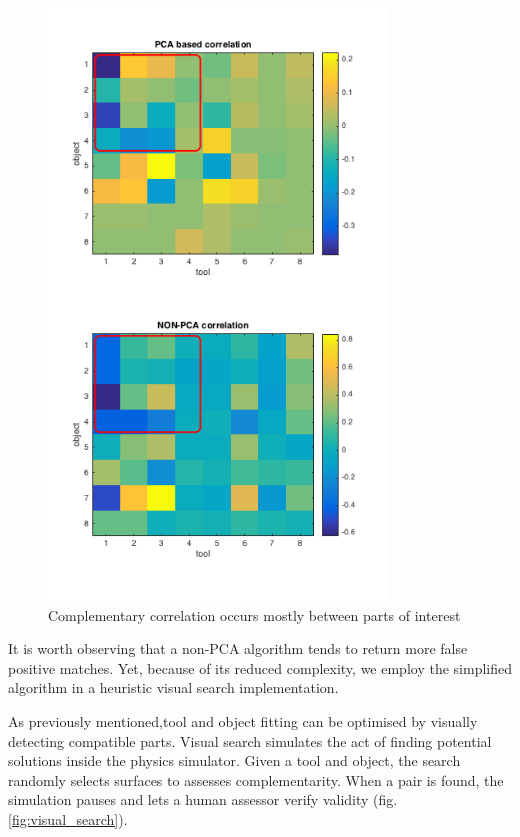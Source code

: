 \documentclass[11]{article}
\begin{document}
\begin{figure}[!h]
  \centering
  \includegraphics[width=0.8\textwidth]{figures/correlation_comparison.png}
  \caption{Complementary correlation occurs mostly between parts of interest}
  \label{fig:correlation_parts}
\end{figure}  

It is worth observing that a non-PCA algorithm tends to return more false positive matches. 
Yet, because of its reduced complexity, we employ the simplified algorithm in a heuristic visual search implementation.

As previously mentioned,tool and object fitting can be optimised by visually detecting compatible parts.  
Visual search simulates the act of finding potential solutions inside the physics simulator.
Given a tool and object, the search randomly selects surfaces to assesses complementarity.
When a pair is found, the simulation pauses and lets a human assessor verify validity (fig. \ref{fig:visual_search}). 
\end{document}
